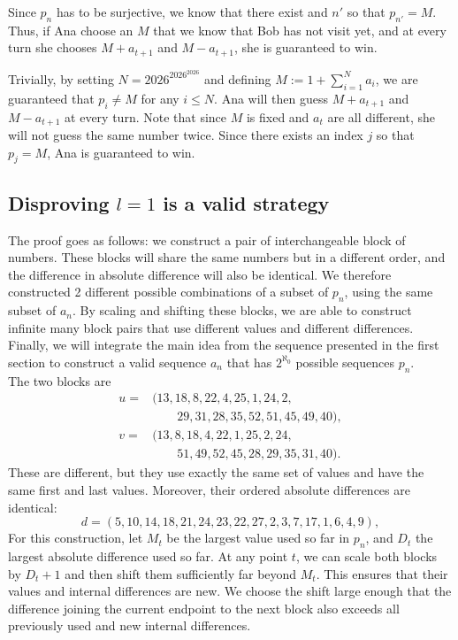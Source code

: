 \documentclass[11pt,a4paper]{article}
\theoremstyle{definition}
\theoremstyle{remark}
\numberwithin{equation}{section}
\begin{document}
Since $p_n$ has to be surjective, we know that there exist and $n'$ so that $p_{n'}=M$. Thus, if Ana choose an $M$ that we know that Bob has not visit yet, and at every turn she chooses $M+a_{t+1}$ and $M-a_{t+1}$, she is guaranteed to win. 

Trivially, by setting $N = 2026^{2026^{2026}}$ and defining $M:=1+ \sum_{i=1}^{N}a_i$, we are guaranteed that $p_i \ne M$ for any $i \le N$. Ana will then guess $M+a_{t+1}$ and $M-a_{t+1}$ at every turn. Note that since $M$ is fixed and $a_t$ are all different, she will not guess the same number twice. Since there exists an index $j$ so that $p_j=M$, Ana is guaranteed to win. 

\subsection{Disproving $l=1$ is a valid strategy}
The proof goes as follows: we construct a pair of interchangeable block of numbers. These blocks will share the same numbers but in a different order, and the difference in absolute difference will also be identical. We therefore constructed 2 different possible combinations of a subset of $p_n$, using the same subset of $a_n$. By scaling and shifting these blocks, we are able to construct infinite many block pairs that use different values and different differences. Finally, we will integrate the main idea from the sequence presented in the first section to construct a valid sequence $a_n$ that has $2^{\aleph_0}$ possible sequences $p_n$. 
\\


The two blocks are 
\[
\begin{aligned}
u={}&(13,18,8,22,4,25,1,24,2,\\
    &\qquad29,31,28,35,52,51,45,49,40),\\[2mm]
v={}&(13,8,18,4,22,1,25,2,24,\\
    &\qquad51,49,52,45,28,29,35,31,40).
\end{aligned}
\]
These are different, but they use exactly the same set of values and have the same first and last values. Moreover, their ordered absolute differences are identical:
\[
d=(5,10,14,18,21,24,23,22,27,2,3,7,17,1,6,4,9),
\]
For this construction, let $M_t$ be the largest value used so far in $p_n$,
and $D_t$ the largest absolute difference used so far. At any point $t$,
we can scale both blocks by $D_t+1$ and then shift them sufficiently far
beyond $M_t$. This ensures that their values and internal differences are
new. We choose the shift large enough that the difference joining the current
endpoint to the next block also exceeds all previously used and new internal
differences.
\end{document}
